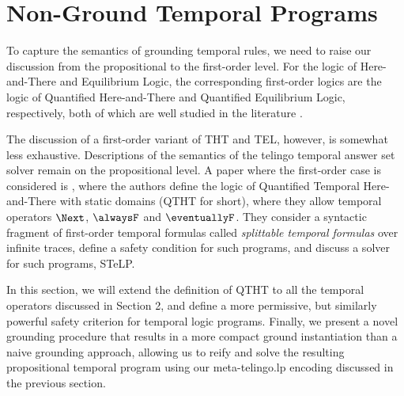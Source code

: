 \section{Non-Ground Temporal Programs}\label{sec:non-ground}

To capture the semantics of grounding temporal rules, we need to raise
our discussion from the propositional to the first-order level. For
the logic of Here-and-There and Equilibrium Logic, the corresponding
first-order logics are the logic of Quantified Here-and-There and
Quantified Equilibrium Logic, respectively, both of which are well
studied in the literature \cite{peaval06a} \cite{peaval08a}.

The discussion of a first-order variant of THT and TEL, however, is
somewhat less exhaustive. Descriptions of the semantics of the telingo
temporal answer set solver remain on the propositional level. A paper
where the first-order case is considered is \cite{agcapevidi17a},
where the authors define the logic of Quantified Temporal
Here-and-There with static domains (QTHT for short), where they allow
temporal operators $\Next$, $\alwaysF$ and $\eventuallyF$. They
consider a syntactic fragment of first-order temporal formulas called
\emph{splittable temporal formulas} over infinite traces, define a
safety condition for such programs, and discuss a solver for such
programs, STeLP.

In this section, we will extend the definition of QTHT to all the
temporal operators discussed in Section 2, and define a more
permissive, but similarly powerful safety criterion for temporal logic
programs. Finally, we present a novel grounding procedure that results
in a more compact ground instantiation than a naive grounding
approach, allowing us to reify and solve the resulting propositional
temporal program using our meta-telingo.lp encoding discussed in the
previous section.




